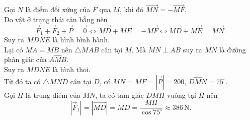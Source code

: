 \begin{bt}
{\begin{center}
\begin{tikzpicture}[font=\footnotesize, line join=round, line cap=round, >=stealth, scale=1]
			\end{tikzpicture}
		\end{center}
		Gọi $N$ là điểm đối xứng của $F$ qua $M$, khi đó $\overrightarrow{MN}=-\overrightarrow{MF}$.\\
		Do vật ở trạng thái cân bằng nên $$\overrightarrow{F}_1 +\overrightarrow{F}_2+\overrightarrow{P}=\overrightarrow{0} \Leftrightarrow \overrightarrow{MD}+ \overrightarrow{ME} = -\overrightarrow{MF} \Leftrightarrow \overrightarrow{MD}+ \overrightarrow{ME} = \overrightarrow{MN}.$$
		Suy ra $MDNE$ là hình bình hành.\\
		Lại có $MA=MB$ nên $\triangle MAB$ cân tại $M$. Mà $MN\perp AB$ suy ra $MN$ là đường phân giác của $\widehat{AMB}$.\\
		Suy ra $MDNE$ là hình thoi.\\
		Từ đó ta có $\triangle MND$ cân tại $D$, có $MN=MF=\left|\overrightarrow{P}\right|=200$, $\widehat{DMN}=75^\circ$.\\
		Gọi $H$ là trung điểm của $MN$, ta có tam giác $DMH$ vuông tại $H$ nên
		$$\left|\overrightarrow{F}_1\right| = \left|\overrightarrow{MD}\right| = MD = \dfrac{MH}{\cos75^\circ} \approx 386\, \mathrm{N}.$$}
\end{bt}

